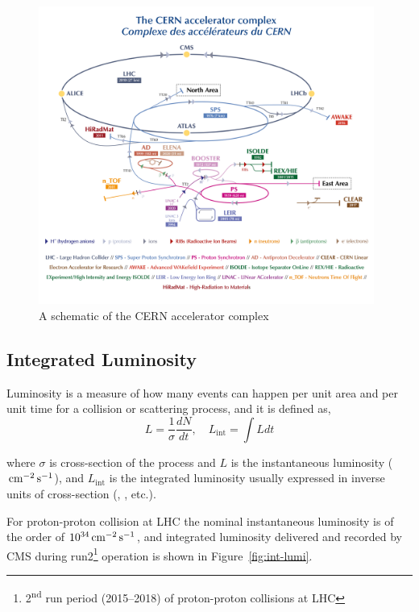 \begin{figure}[!ht]
  \centering
  \includegraphics[width=0.98\textwidth]{figures/lhc-scheme.png}
  \caption[A schematic of the CERN accelerator complex]%
  {A schematic of the CERN accelerator complex~\cite{image-lhc-scheme}}%
  \label{fig:lhc}
\end{figure}

\subsection{
  Integrated Luminosity
}\label{ch_cms:cms-lumi}

Luminosity is a measure of how many events can happen per unit area and per
unit time for a collision or scattering process, and it is defined as,
%
\begin{equation}
  L = \frac{1}{\sigma} \frac{dN}{dt}, \quad L_{\text{int}} = \int L dt
\end{equation}

where \(\sigma \) is cross-section of the process
and \(L\) is the instantaneous luminosity (\( \,\text{cm}{}^{-2} \,\text{s}^{-1} \)),
and \( L_{\text{int}} \) is the integrated luminosity usually
expressed in inverse units of cross-section (\pbinv{}, \fbinv{}, etc.).

For proton-proton collision at \gls{LHC}
the nominal instantaneous luminosity is of the order of \( 10^{34} \,\text{cm}{}^{-2} \,\text{s}^{-1}\),
and integrated luminosity delivered and recorded by \gls{CMS} during run2\footnote{2\textsuperscript{nd} run period (2015--2018) of proton-proton collisions at LHC} operation
is shown in Figure~\ref{fig:int-lumi}.

